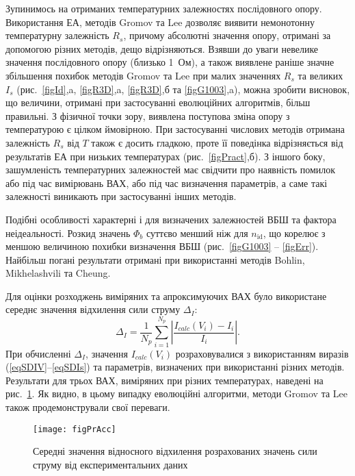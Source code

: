 Зупинимось на отриманих температурних залежностях послідовного опору.
Використання ЕА, методів Gromov та Lee дозволяє виявити немонотонну температурну залежність $R_s$, причому абсолютні значення опору, отримані за допомогою різних методів, дещо відрізняються.
Взявши до уваги невелике значення послідовного опору (близько 1~Ом), а також виявлене раніше значне збільшення похибок методів Gromov та Lee при малих значеннях $R_s$ та великих $I_s$ (рис.~\ref{figId},a, \ref{figR3D},a, \ref{figR3D},б та \ref{figG1003},a), можна зробити висновок, що величини, отримані при застосуванні еволюційних алгоритмів, більш правильні.
З фізичної точки зору, виявлена поступова зміна опору з температурою є цілком ймовірною.
При застосуванні числових методів отримана залежність $R_s$ від $T$ також є досить гладкою, проте її поведінка відрізняється від результатів ЕА при низьких температурах (рис.~\ref{figPract},б).
З іншого боку, зашумленість температурних залежностей має свідчити про наявність помилок або під час вимірювань ВАХ, або під час визначення параметрів, а саме такі залежності виникають при застосуванні інших методів.

Подібні особливості характерні і для визначених залежностей ВБШ та фактора неідеальності.
Розкид значень $\Phi_b$ суттєво менший ніж для $n_\mathrm{id}$, що корелює з меншою величиною похибки визначення ВБШ (рис.~\ref{figG1003} -- \ref{figErr}).
Найбільш погані результати отримані при використанні методів Bohlin, Mikhelashvili та Cheung.

Для оцінки розходжень виміряних та апроксимуючих ВАХ було використане середнє значення відхилення сили струму $\Delta_I$:
 \begin{equation}
 \label{eqMCur}
 \Delta_I=\frac{1}{N_p}\sum_{i=1}^{N_p}\left|\frac{I_{calc}(V_i)-I_i}{I_i}\right|.
 \end{equation}
При обчисленні $\Delta_I$, значення $I_{calc}(V_i)$ розраховувалися з використанням виразів (\ref{eqSDIV}--\ref{eqSDIs}) та параметрів, визначених при використанні різних методів.
Результати для трьох ВАХ, виміряних при різних температурах, наведені на рис.~\ref{figPrAcc}.
Як видно, в цьому випадку еволюційні алгоритми, методи Gromov та Lee також продемонстрували свої переваги.


\begin{figure}
\center
\texttt{[image: figPrAcc]}%
\caption{\label{figPrAcc}
Середні значення відносного відхилення розрахованих значень сили струму від експериментальних даних
}
\end{figure}


